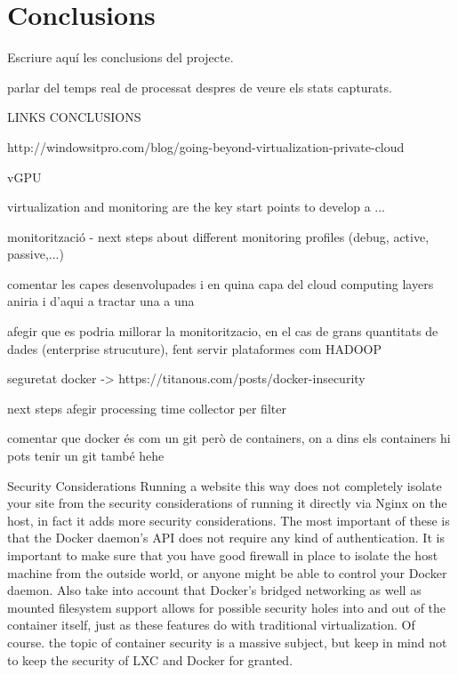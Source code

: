 \cleardoublepage
{}
\chapter*{Conclusions}\label{C:conclusions}

Escriure aquí les conclusions del projecte. 

parlar del temps real de processat despres de veure els stats capturats.

LINKS CONCLUSIONS

http://windowsitpro.com/blog/going-beyond-virtualization-private-cloud

vGPU

virtualization and monitoring are the key start points to develop a ...

monitorització - next steps about different monitoring profiles (debug, active, passive,...)

comentar les capes desenvolupades i en quina capa del cloud computing layers aniria i d'aqui a tractar una a una

afegir que es podria millorar la monitoritzacio, en el cas de grans quantitats de dades (enterprise strucuture), fent servir plataformes com HADOOP

seguretat docker -> https://titanous.com/posts/docker-insecurity

next steps afegir processing time collector per filter


comentar que docker és com un git però de containers, on a dins els containers hi pots tenir un git també hehe

Security Considerations
Running a website this way does not completely isolate your site from the security considerations of running it directly via Nginx on the host, in fact it adds more security considerations. The most important of these is that the Docker daemon’s API does not require any kind of authentication. It is important to make sure that you have good firewall in place to isolate the host machine from the outside world, or anyone might be able to control your Docker daemon. Also take into account that Docker’s bridged networking as well as mounted filesystem support allows for possible security holes into and out of the container itself, just as these features do with traditional virtualization. Of course. the topic of container security is a massive subject, but keep in mind not to keep the security of LXC and Docker for granted.

